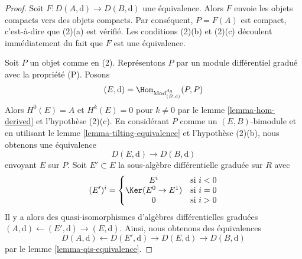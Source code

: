 \begin{proof}
Soit $F : D(A, \text{d}) \to D(B, \text{d})$ une équivalence. Alors $F$
envoie les objets compacts vers des objets compacts. Par conséquent, $P = F(A)$ est
compact, c'est-à-dire que (2)(a) est vérifié. Les conditions (2)(b) et (2)(c) découlent
immédiatement du fait que $F$ est une équivalence.

\medskip\noindent
Soit $P$ un objet comme en (2). Représentons $P$ par un
module différentiel gradué avec la propriété (P). Posons
$$
(E, \text{d}) = \Hom_{\text{Mod}^{dg}_{(B, \text{d})}}(P, P)
$$
Alors $H^0(E) = A$ et $H^k(E) = 0$ pour $k \not = 0$ par le
lemme \ref{lemma-hom-derived} et l'hypothèse (2)(c). En
considérant $P$ comme un $(E, B)$-bimodule et en utilisant
le lemme \ref{lemma-tilting-equivalence} et l'hypothèse (2)(b), nous
obtenons une équivalence
$$
D(E, \text{d}) \to D(B, \text{d})
$$
envoyant $E$ sur $P$.
Soit $E' \subset E$ la sous-algèbre différentielle graduée sur $R$
avec
$$
(E')^i = \left\{
\begin{matrix}
E^i & \text{si }i < 0 \\
\Ker(E^0 \to E^1) & \text{si }i = 0 \\
0 & \text{si }i > 0
\end{matrix}
\right.
$$
Il y a alors des quasi-isomorphismes d'algèbres
différentielles graduées $(A, \text{d}) \leftarrow (E', \text{d}) \rightarrow (E, \text{d})$. Ainsi,
nous obtenons des équivalences
$$
D(A, \text{d}) \leftarrow D(E', \text{d}) \rightarrow D(E, \text{d})
\rightarrow D(B, \text{d})
$$
par le lemme \ref{lemma-qis-equivalence}.
\end{proof}

